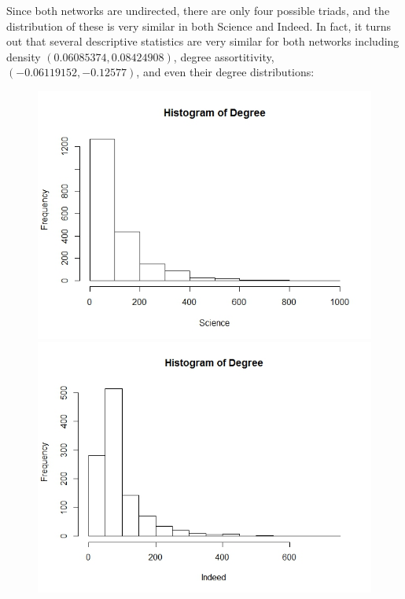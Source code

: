 \documentclass[12pt]{article}
\begin{document}
\noindent Since both networks are undirected, there are only four possible triads, and the distribution of these is very similar in both Science and Indeed. In fact, it turns out that several descriptive statistics are very similar for both networks including density $(0.06085374, 0.08424908)$, degree assortitivity, $(-0.06119152, -0.12577)$, and even their degree distributions:
\vspace{2mm}
\begin{figure}[H]
	\centering
	\includegraphics[scale=0.3]{Images/degree_hist_sci.jpeg}
	\includegraphics[scale=0.3]{Images/degree_hist_ind.jpeg}
\end{figure}
\vspace{2mm} 
\end{document}
